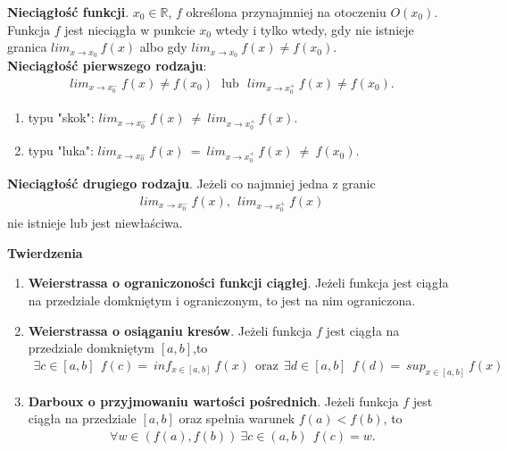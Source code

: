 \documentclass[main.tex]{subfiles}
\begin{document}
    \begin{definition}
        \textbf{Nieciągłość funkcji}. $x_0 \in \mathbb{R}$, $f$ określona przynajmniej na otoczeniu $O(x_0)$.
        Funkcja $f$ jest nieciągła w punkcie $x_0$ wtedy i tylko wtedy, gdy nie istnieje
        granica $lim_{x \rightarrow x_0} ~ f(x)$ albo gdy $lim_{x \rightarrow x_0} ~ f(x) \neq f(x_0)$.
        \hfill \\

        \textbf{Nieciągłość pierwszego rodzaju}:
        \begin{align*}
            lim_{x \rightarrow x^{-}_0} ~ f(x) \neq  f(x_0) ~~~ \text{lub} ~~~ lim_{x \rightarrow x^{+}_0} ~ f(x) \neq f(x_0).
        \end{align*}
        \begin{enumerate}
            \item typu "skok": $lim_{x \rightarrow x^{-}_0} ~ f(x) ~ \neq ~ lim_{x \rightarrow x^{+}_0} ~ f(x)$.
            \item typu "luka": $lim_{x \rightarrow x^{-}_0} ~ f(x) ~ = ~ lim_{x \rightarrow x^{+}_0} ~ f(x) ~ \neq ~ f(x_0)$.
        \end{enumerate}

        \textbf{Nieciągłość drugiego rodzaju}. Jeżeli co najmniej jedna z granic
        \begin{align*}
            lim_{x \rightarrow x^{-}_0} ~ f(x), ~~ lim_{x \rightarrow x^{+}_0} ~ f(x)
        \end{align*}
        nie istnieje lub jest niewłaściwa.
    \end{definition}

    \begin{theorem}
        \textbf{Twierdzenia}
        \begin{enumerate}
            \item \textbf{Weierstrassa o ograniczoności funkcji ciągłej}. Jeżeli funkcja jest ciągła na przedziale domkniętym
            i ograniczonym, to jest na nim ograniczona.

            \item \textbf{Weierstrassa o osiąganiu kresów}. Jeżeli funkcja $f$ jest ciągła na przedziale domkniętym $[a, b]$,to
            \begin{align*}
                \exists c \in [a,b] ~~ f(c) = ~ inf_{x \in [a,b]} ~ f(x) ~~ \text{oraz} ~~ \exists d \in [a,b] ~~ f(d) = ~ sup_{x \in [a,b]} ~ f(x)
            \end{align*}

            \item \textbf{Darboux o przyjmowaniu wartości pośrednich}. Jeżeli funkcja $f$ jest ciągła na przedziale $[a,b]$ oraz
            spełnia warunek $f(a) < f(b)$, to
            \begin{align*}
                \forall w \in (f(a), f(b)) ~ \exists c \in (a,b) ~~ f(c) = w.
            \end{align*}
        \end{enumerate}
    \end{theorem}
\end{document}
